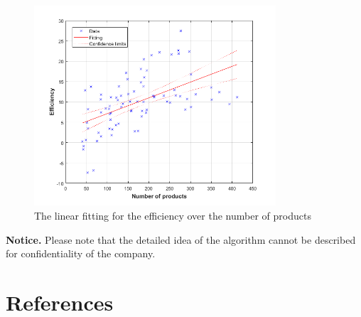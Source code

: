 \documentclass[review]{elsarticle}
\begin{document}
\begin{figure}[h!]
	\centering
	\includegraphics[width=9cm]{Graph_3.png}
	\caption{The linear fitting for the efficiency over the number of products}
	\label{fig:LinearFitting}       %
\end{figure}


{\bf Notice.} Please note that the detailed idea of the algorithm cannot be described for confidentiality of the company.

\section*{References}


\end{document}
